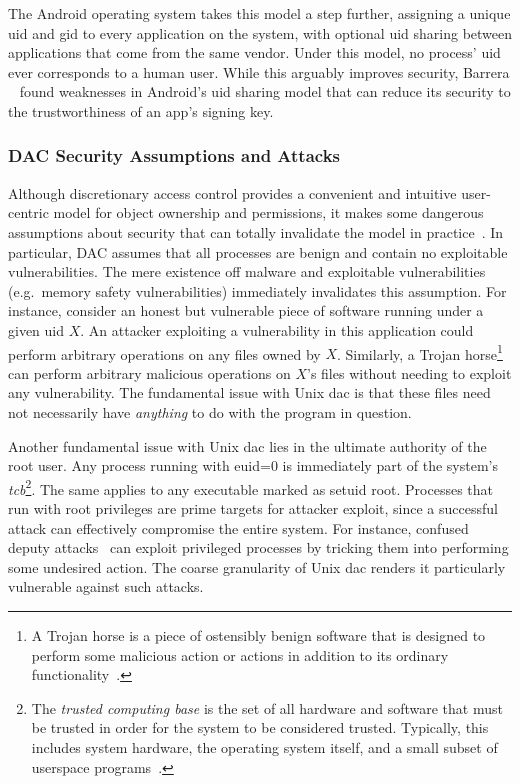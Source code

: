 The Android operating system takes this model a step further, assigning a unique \gls{uid}
and \gls{gid} to every application on the system, with optional \gls{uid} sharing between
applications that come from the same vendor. Under this model, no process' \gls{uid} ever
corresponds to a human user. While this arguably improves security, Barrera
\etal~\cite{barrera2012_android} found weaknesses in Android's \gls{uid} sharing model
that can reduce its security to the trustworthiness of an app's signing key.

\subsubsection*{DAC Security Assumptions and Attacks}

Although discretionary access control provides a convenient and intuitive user-centric
model for object ownership and permissions, it makes some dangerous assumptions about
security that can totally invalidate the model in
practice~\cite{shu2016_security_isolation_study}. In particular, DAC assumes that all
processes are benign and contain no exploitable vulnerabilities. The mere existence off
malware and exploitable vulnerabilities (e.g.~memory safety vulnerabilities) immediately
invalidates this assumption. For instance, consider an honest but vulnerable piece of
software running under a given \gls{uid} $X$. An attacker exploiting a vulnerability in
this application could perform arbitrary operations on any files owned by $X$. Similarly,
a Trojan horse\footnote{A Trojan horse is a piece of ostensibly benign software that
is designed to perform some malicious action or actions in addition to its ordinary
functionality~\cite{van_oorschot2020_tools_jewels}.}~\cite{shu2016_security_isolation_study,
van_oorschot2020_tools_jewels} can perform arbitrary malicious operations on $X$'s files
without needing to exploit any vulnerability. The fundamental issue with Unix \gls{dac} is
that these files need not necessarily have \textit{anything} to do with the program in
question.

Another fundamental issue with Unix \gls{dac} lies in the ultimate authority of the root
user. Any process running with \gls{euid}=0 is immediately part of the system's
\textit{\gls{tcb}}\footnote{The \textit{trusted computing base} is the set of all hardware
and software that must be trusted in order for the system to be considered trusted.
Typically, this includes system hardware, the operating system itself, and a small subset
of userspace programs~\cite{jaeger2008_os_security}.}. The same applies to any executable
marked as setuid root. Processes that run with root privileges are prime targets for
attacker exploit, since a successful attack can effectively compromise the entire system.
For instance, confused deputy attacks~\cite{hardy1988_confused_deputy,
shu2016_security_isolation_study} can exploit privileged processes by tricking them into
performing some undesired action. The coarse granularity of Unix \gls{dac} renders it
particularly vulnerable against such attacks.

